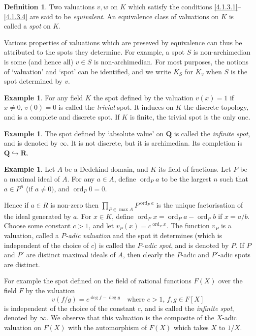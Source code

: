 \documentclass[10pt]{article}
\theoremstyle{definition}
\newtheorem{defi}[theo]{Definition}
\newtheorem{exam}[theo]{Example}
\def\QQ{\mathbf{Q}}
\def\RR{\mathbf{R}}
\DeclareMathOperator{\ord}{ord}
\def\qw#1{`#1'}
\begin{document}
\begin{defi}
\label{4.1.4}
Two valuations $v,w$ on $K$ which satisfy the conditions \eqref{4.1.3.1}--\eqref{4.1.3.4} are said to be \emph{equivalent}.
An equivalence class of valuations on $K$ is called a \emph{spot} on $K$.
\end{defi}


Various properties of valuations which are preseved by equivalence can thus be attributed to the spots they determine.
For example, a spot $S$ is non-archi\-median is some (and hence all) $v \in S$ is non-archimedian.
For most purposes, the notions of \qw{valuation} and \qw{spot} can be identified, and we write $K_S$ for $K_v$ when $S$ is the spot determined by $v$.


\begin{exam}
\label{4.1.5}
For any field $K$ the spot defined by the valuation $v(x) = 1$ if $x \not=0$, $v(0) = 0$ is called the \emph{trivial} spot.
It induces on $K$ the discrete topology, and is a complete and discrete spot.
If $K$ is finite, the trivial spot is the only one.
\end{exam}


\begin{exam}
\label{4.1.6}
The spot defined by \qw{absolute value} on $\QQ$ is called the \emph{infinite spot}, and is denoted by $\infty$.
It is not discrete, but it is archimedian.
Its completion is $\QQ \hookrightarrow \RR$.
\end{exam}


\begin{exam}
\label{4.1.7}
Let $A$ be a Dedekind domain, and $K$ its field of fractions.
Let $P$ be a maximal ideal of $A$.
For any $a \in A$, define $\ord_P a$ to be the largest $n$ such that $a \in P^n$ (if $a \not= 0)$, and $\ord_P 0 = 0$.

Hence if $a \in R$ is non-zero then $\prod_{P \in \max A} P^{\ord_P a}$ is the unique factorisation of the ideal generated by $a$.
For $x \in K$, define $\ord_P x = \ord_P a - \ord_P b$ if $x = a/b$.
Choose some constant $c > 1$, and let $v_P(x) = c^{\ord_P x}$.
The function $v_P$ is a valuation, called a \emph{$P$-adic valuation} and the spot it determines (which is independent of the choice of $c$) is called the \emph{$P$-adic spot}, and is denoted by $P$.
If $P$ and $P'$ are distinct maximal ideals of $A$, then clearly the $P$-adic and $P'$-adic spots are distinct.

For example the spot defined on the field of rational functions $F(X)$ over the field $F$ by the valuation
\[
v(f/g) = c^{\deg f - \deg g}
\quad
\text{where $c > 1$, $f,g \in F[X]$}
\]
is independent of the choice of the constant $c$, and is called the \emph{infinite spot}, denoted by $\infty$.
We observe that this valuation is the composite of the $X$-adic valuation on $F(X)$ with the automorphism of $F(X)$ which takes $X$ to $1/X$.
\end{exam}
\end{document}

